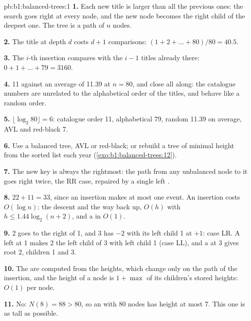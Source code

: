 \begin{solution}{pb:b1:balanced-trees:1}
\textbf{1.} Each new title is larger than all the previous ones: the search goes right at every node, and the new node
becomes the right child of the deepest one. The tree is a path of $n$ nodes.

\textbf{2.} The title at depth $d$ costs $d + 1$ comparisons: $(1 + 2 + \dots + 80)/80 = 40.5$.

\textbf{3.} The $i$-th insertion compares with the $i - 1$ titles already there: $0 + 1 + \dots + 79 = 3160$.

\textbf{4.} 11 against an average of 11.39 at $n = 80$, and close all along: the catalogue numbers are unrelated to the
alphabetical order of the titles, and behave like a random order.

\textbf{5.} $\lfloor \log_2 80 \rfloor = 6$: catalogue order 11, alphabetical 79, random 11.39 on average, AVL and
red-black 7.

\textbf{6.} Use a balanced tree, AVL or red-black; or rebuild a tree of minimal height from the sorted list each year
(\cref{exo:b1:balanced-trees:12}).

\textbf{7.} The new key is always the rightmost: the path from any unbalanced node to it goes right twice, the RR case,
repaired by a single left .

\textbf{8.} $22 + 11 = 33$, since an insertion makes at most one  event. An insertion costs $O(\log n)$: the
descent and the way back up, $O(h)$ with $h \leq 1.44 \log_2 (n + 2)$, and a  in $O(1)$.

\textbf{9.} 2 goes to the right of 1, and 3 has  $-2$ with its left child 1 at $+1$: case LR. A left
 at 1 makes 2 the left child of 3 with left child 1 (case LL), and a  at 3 gives root 2, children
1 and 3.

\textbf{10.} The  are computed from the heights, which change only on the path of the insertion, and the
height of a node is $1 + \max$ of its children's stored heights: $O(1)$ per node.

\textbf{11.} No: $N(8) = 88 > 80$, so an  with 80 nodes has height at most 7. This one is as tall as possible.


\end{solution}
